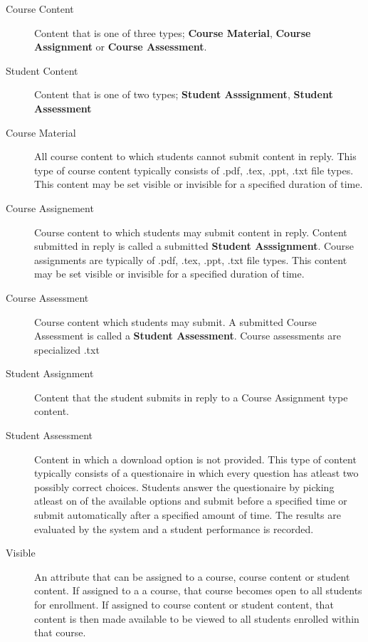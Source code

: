 \documentclass[]{article}
\begin{document}
\begin{description}
	\item [Course Content] Content that is one of three types; \textbf{Course Material}, \textbf{Course Assignment} or \textbf{Course Assessment}.

	\item [Student Content] Content that is one of two types; \textbf{Student Asssignment}, \textbf{Student Assessment}

	\item [Course Material] All course content to which students cannot submit content in reply. This type of course content typically consists of .pdf, .tex, .ppt, .txt file types. This content may be set visible or invisible for a specified duration of time.

	\item [Course Assignement] Course content to which students may submit content in reply. Content submitted in reply is called a submitted \textbf{Student Asssignment}. Course assignments are typically of .pdf, .tex, .ppt, .txt file types. This content may be set visible or invisible for a specified duration of time.

	\item [Course Assessment] Course content which students may submit. A submitted Course Assessment is called a \textbf{Student Assessment}. Course assessments are specialized .txt

	\item [Student Assignment] Content that the student submits in reply to a Course Assignment type content.

	\item [Student Assessment] Content in which a download option is not provided. This type of content typically consists of a questionaire in which every question has atleast two possibly correct choices. Students answer the questionaire by picking atleast on of the available options and submit before a specified time or submit automatically after a specified amount of time. The results are evaluated by the system and a student performance is recorded. 

	\item [Visible] An attribute that can be assigned to a course, course content or student content. If assigned to a a course, that course becomes open to all students for enrollment. If assigned to course content or student content, that content is then made available to be viewed to all students enrolled within that course.

\end{description}
\end{document}
